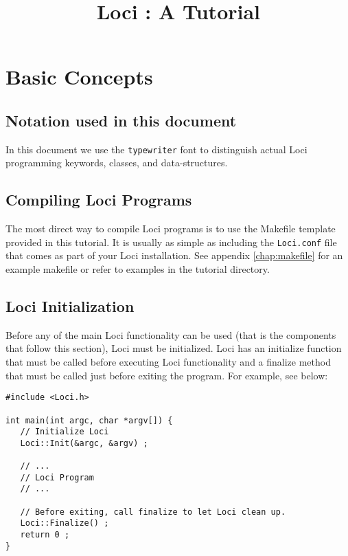 \documentclass[10pt,epsf]{book}
\title { Loci : A Tutorial }
\begin{document}
\tableofcontents
\maketitle
\thispagestyle{empty}
\newpage
\setcounter{page}{1}


%

\chapter{ Basic Concepts }

\section{Notation used in this document}
In this document we use the {\tt typewriter} font to distinguish
actual Loci programming keywords, classes, and data-structures.

\section{ Compiling Loci Programs }

The most direct way to compile Loci programs is to use the Makefile
template provided in this tutorial.  It is usually as simple as
including the {\tt Loci.conf} file that comes as part of your Loci
installation.  See appendix \ref{chap:makefile} for an example
makefile or refer to examples in the tutorial directory.


\section{Loci Initialization}

Before any of the main Loci functionality can be used (that is the
components that follow this section), Loci must be initialized.  Loci
has an initialize function that must be called before executing Loci
functionality and a finalize method that must be called just before
exiting the program.  For example, see below:

\begin{verbatim}
#include <Loci.h>

int main(int argc, char *argv[]) {
   // Initialize Loci
   Loci::Init(&argc, &argv) ;

   // ...
   // Loci Program
   // ...

   // Before exiting, call finalize to let Loci clean up.
   Loci::Finalize() ;
   return 0 ;
}
\end{verbatim}
\end{document}
